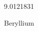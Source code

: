 \documentclass[12pt]{article}
\begin{document}
\hfill{}
\vfill
\begin{center}
  {\fontsize{50}{60}
  }

  9.0121831

Beryllium
\end{center}
\vfill
\end{document}
